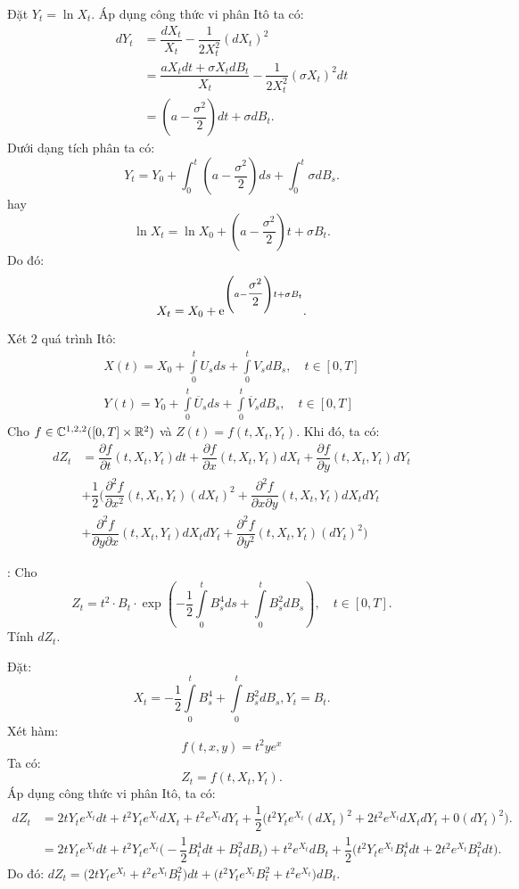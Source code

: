 \begin{sol*}
    Đặt $Y_t =\ln X_t$. Áp dụng công thức vi phân Itô ta có:
    \begin{align*}
        dY_t &= \dfrac{dX_t}{X_t} - \dfrac{1}{2X_t^2}(dX_t)^2\\
        &= \dfrac{aX_tdt+\sigma X_tdB_t}{X_t} - \dfrac{1}{2X_t^2}(\sigma X_t)^2 dt \\
        &= \left(a -\dfrac{\sigma^2}{2}\right)dt + \sigma dB_t.
    \end{align*}
    Dưới dạng tích phân ta có:
    \[Y_t = Y_0 + \displaystyle \int_0^t \left(a -\dfrac{\sigma^2}{2}\right)ds + \displaystyle \int_0^t \sigma dB_s.\]
    hay \[\ln X_t = \ln X_0 + \left(a -\dfrac{\sigma^2}{2}\right)t + \sigma B_t.\]
    Do đó: \[X_t = X_0 + \mathrm{e}^{\left(a -\dfrac{\sigma^2}{2}\right)t + \sigma B_t}.\]
\end{sol*}
\begin{thm}
    Xét 2 quá trình Itô: 
    \begin{align*}
        X(t) = X_0 + \int\limits_0^tU_sds +\int\limits_0^tV_sdB_s, \quad t \in [0, T]\\
        Y(t) = Y_0 + \int\limits_0^t\overline{U}_sds + \int\limits_0^t\overline{V}_sdB_s, \quad t \in [0, T]
    \end{align*}
    Cho $f \in \mathbb{C}^{1, 2, 2}([0, T]\times \mathbb{R}^2)$ và $Z(t) = f(t, X_t, Y_t)$. Khi đó, ta có: 
    \begin{align*}
        dZ_t &= \dfrac{\partial f}{\partial t}(t, X_t, Y_t)dt + \dfrac{\partial f}{\partial x}(t, X_t, Y_t)dX_t + \dfrac{\partial f}{\partial y}(t, X_t, Y_t)dY_t\\
        &+ \dfrac{1}{2}\bigg(\dfrac{\partial ^2f}{\partial x^2}(t, X_t, Y_t)(dX_t)^2 + \dfrac{\partial ^2f}{\partial x \partial y}(t, X_t, Y_t)dX_tdY_t \\
        &+ \dfrac{\partial ^2f}{\partial y \partial x}(t, X_t, Y_t)dX_tdY_t + \dfrac{\partial^2f}{\partial y^2}(t, X_t, Y_t)(dY_t)^2\bigg)
    \end{align*}
\end{thm}
\examplename:  Cho
\[Z_t = t^2 \cdot B_t \cdot \exp\left(-\frac{1}{2}\int\limits_0^t B_s^4ds + \int\limits_0^t B_s^2dB_s\right), \quad t\in [0, T].\] 
Tính $dZ_t$.
\begin{sol*}
    Đặt: \[X_t = -\dfrac{1}{2} \int\limits_0^tB_s^4 + \int\limits_0^t  B_s^2dB_s, Y_t = B_t.\]
    Xét hàm: \[f(t, x, y) = t^2ye^x\] Ta có: \[Z_t = f(t, X_t, Y_t).\]
    Áp dụng công thức vi phân Itô, ta có: 
    \begin{align*}
        dZ_t 
        &=  2tY_te^{X_t}dt + t^2Y_te^{X_t}dX_t
        + t^2e^{X_t}dY_t + \dfrac{1}{2}\Big(t^2Y_te^{X_t}(dX_t)^2 + 2t^2e^{X_t}dX_tdY_t + 0(dY_t)^2\Big).\\
        &= 2tY_te^{X_t}dt + t^2Y_te^{X_t}\Big(-\dfrac{1}{2}B_t^4dt + B_t^2dB_t\Big) + t^2e^{X_t}dB_t + \dfrac{1}{2}\Big(t^2Y_te^{X_t}B_t^4dt + 2t^2e^{X_t}B_t^2dt\Big).
    \end{align*}
    Do đó: $dZ_t = \Big(2tY_te^{X_t} + t^2e^{X_t}B_t^2\Big)dt + \Big(t^2Y_te^{X_t}B_t^2 + t^2e^{X_t}\Big)dB_t.$
\end{sol*}
